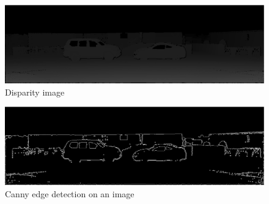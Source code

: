 \begin{figure}[H]
\centering
\includegraphics[scale=0.35]{imggt5}
\caption{Disparity image}
\label{fig:imggt5}
\end{figure} 

\begin{figure}[H]
\centering
\includegraphics[scale=0.35]{mask5nodil}
\caption{Canny edge detection on an image}
\label{fig:edgenodil}
\end{figure} 

